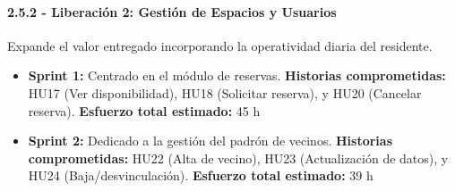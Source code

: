 \paragraph{2.5.2 - Liberación 2: Gestión de Espacios y Usuarios}

Expande el valor entregado incorporando la operatividad diaria del residente.
\begin{itemize}
    \item \textbf{Sprint 1:} Centrado en el módulo de reservas.  
    \textbf{Historias comprometidas:} HU17 (Ver disponibilidad), HU18 (Solicitar reserva), y HU20 (Cancelar reserva).  
    \textbf{Esfuerzo total estimado:} 45 h
    
    \item \textbf{Sprint 2:} Dedicado a la gestión del padrón de vecinos.  
    \textbf{Historias comprometidas:} HU22 (Alta de vecino), HU23 (Actualización de datos), y HU24 (Baja/desvinculación).  
    \textbf{Esfuerzo total estimado:} 39 h
\end{itemize}

